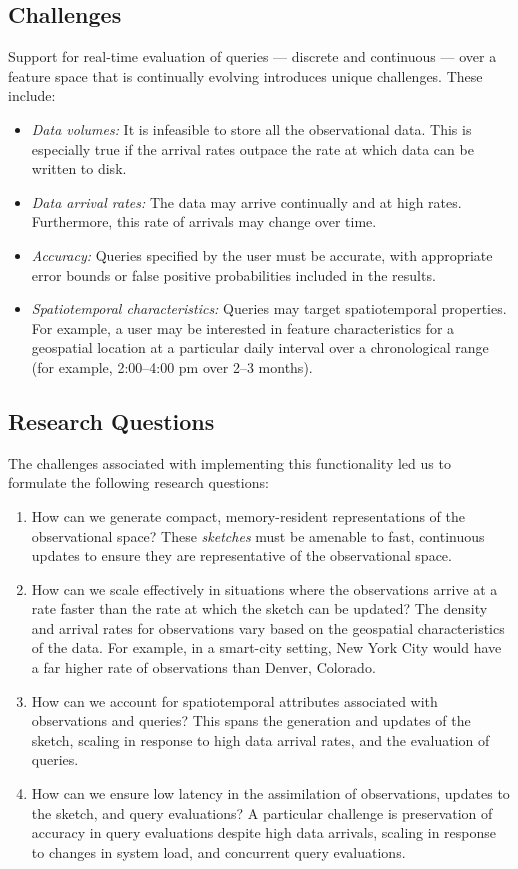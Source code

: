 \subsection{Challenges}
Support for real-time evaluation of queries --– discrete and continuous --– over a feature space that is continually evolving introduces unique challenges. These include:
\begin{itemize}
    \item   \emph{Data volumes:} It is infeasible to store all the observational data. This is especially true if the arrival rates outpace the rate at which data can be written to disk.
    \item   \emph{Data arrival rates:} The data may arrive continually and at high rates. Furthermore, this rate of arrivals may change over time.
    \item   \emph{Accuracy:} Queries specified by the user must be accurate, with appropriate error bounds or false positive probabilities included in the results.
    \item   \emph{Spatiotemporal characteristics:} Queries may target spatiotemporal properties. For example, a user may be interested in feature characteristics for a geospatial location at a particular daily interval over a chronological range (for example, 2:00--4:00 pm over 2--3 months).
\end{itemize}

\subsection{Research Questions}
The challenges associated with implementing this functionality led us to formulate the following research questions:
\begin{enumerate}
    \item   How can we generate compact, memory-resident representations of the observational space? These \emph{sketches} must be amenable to fast, continuous updates to ensure they are representative of the observational space.
    \item   How can we scale effectively in situations where the observations arrive at a rate faster than the rate at which the sketch can be updated? The density and arrival rates for observations vary based on the geospatial characteristics of the data. For example, in a smart-city setting, New York City would have a far higher rate of observations than Denver, Colorado.
    \item   How can we account for spatiotemporal attributes associated with observations and queries? This spans the generation and updates of the sketch, scaling in response to high data arrival rates, and the evaluation of queries.
    \item   How can we ensure low latency in the assimilation of observations, updates to the sketch, and query evaluations? A particular challenge is preservation of accuracy in query evaluations despite high data arrivals, scaling in response to changes in system load, and concurrent query evaluations.
\end{enumerate}


